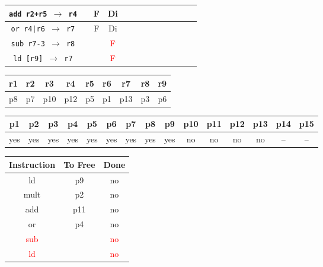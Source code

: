 \documentclass[12pt]{article}
\begin{document}
\begin{enumerate}
\begin{table}[H]
\begin{tabular}{|c|c|c|c|c|c|c|c|c|c|c|c|c|}
					\hline
					\texttt{add r2+r5 $\rightarrow$ r4} &  & F & Di &  &  &  &  &  &  &  &  &\\
					\hline
					\texttt{or r4|r6 $\rightarrow$ r7} &  & F & Di &  &  &  &  &  &  &  &  &\\
					\hline
					\texttt{sub r7-3 $\rightarrow$ r8} &  &  & \textcolor{red}{F} &  &  &  &  &  &  &  &  &\\
					\hline
					\texttt{ld [r9] $\rightarrow$ r7} &  &  & \textcolor{red}{F} &  &  &  &  &  &  &  &  &\\
					\hline 
				\end{tabular}
			\end{table}
			\begin{table}[H]
				\begin{tabular}{|c|c|c|c|c|c|c|c|c|}
					\hline
					r1 & r2 & r3 & r4 & r5 & r6 & r7 & r8 & r9\\
					\hline
					p8 & p7 & p10 & p12 & p5 & p1 & p13 & p3 & p6\\
					\hline
				\end{tabular}
			\end{table}
			\begin{table}[H]
				\begin{tabular}{|c|c|c|c|c|c|c|c|c|c|c|c|c|c|c|}
					\hline
					p1 & p2 & p3 & p4 & p5 & p6 & p7 & p8 & p9 & p10 & p11 & p12 & p13 & p14 & p15\\
					\hline
					yes & yes & yes & yes & yes & yes & yes & yes & yes & no & no & no & no & -- & --\\
					\hline
				\end{tabular}
			\end{table}
			\begin{table}[H]
				\begin{tabular}{|c|c|c|}
					\hline
					Instruction & To Free & Done\\
					\hline
					ld & p9 & no\\
					\hline
					mult & p2 & no\\
					\hline
					add & p11 & no\\
					\hline
					or & p4 & no\\
					\hline
					\textcolor{red}{sub} & & \textcolor{red}{no}\\
					\hline
					\textcolor{red}{ld} & & \textcolor{red}{no}\\
					\hline
				\end{tabular}
				\hfill
				\begin{tabular}{|c|c|c|c|c|c|c|}
					\hline

\end{tabular}
\end{table}
\end{enumerate}
\end{document}
